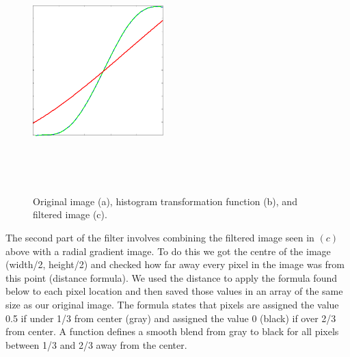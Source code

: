 \documentclass[]{assignment}
\begin{document}
\begin{figure}[h]
\centering
\fboxsep 0mm
\parbox{5cm}{\\}
~~~
\parbox{5cm}{\includegraphics[width=5.05cm]{Trgb.pdf}\\}
~~~
\parbox{5cm}{\\}
\caption{\label{fig:imgfilter1} Original image (a), histogram transformation function (b), and filtered image (c).}
\end{figure} 

The second part of the filter involves combining the filtered image seen in $(c)$ above with a radial gradient image. To do this we got the centre of the image (width/2, height/2) and checked how far away every pixel in the image was from this point (distance formula). We used the distance to apply the formula found below to each pixel location and then saved those values in an array of the same size as our original image. The formula states that pixels are assigned the value 0.5 if under 1/3 from center (gray) and assigned the value 0 (black) if over 2/3 from center. A function defines a smooth blend from gray to black for all pixels between 1/3 and 2/3 away from the center.
\end{document}
